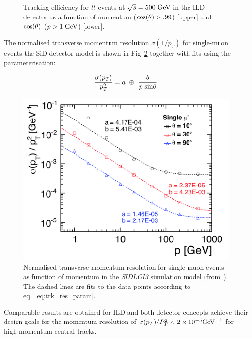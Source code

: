 \begin{figure}
\begin{tabular}[c]{c}
\end{tabular}
  \caption{Tracking efficiency for $t\bar t$-events at $\sqrt{s}=500~\rm{GeV}$ in the ILD detector as a function of
    momentum ($\rm{cos}(\theta)>.99$) [upper]
    and $\rm{cos}(\theta)$ ($p>1~\rm{GeV}$) [lower].}

\label{fig:ild_trkeff}
\end{figure}

The normalised transverse momentum resolution $\sigma(1/p_T)$ for single-muon events the SiD detector model is shown in
Fig~\ref{fig:sid_mom_res} together with fits using the parameterisation:

\begin{equation}
  \frac{\sigma(p_T)}{p^2_T} = a~\oplus~\frac{b}{p~\rm{sin}\theta}     \label{eq:trk_res_param}
\end{equation}

\begin{figure}
\begin{center}
\includegraphics[width=0.95\hsize]{chapters/figures/SiD_momentum_resolution.png}
\end{center}
\caption{Normalised transverse momentum resolution for single-muon events as function of momentum
  in the \emph{SIDLOI3} simulation model (from~\cite{Behnke:2013lya}). The dashed lines are fits to the data points according
  to eq.~\ref{eq:trk_res_param}.}
\label{fig:sid_mom_res}
\end{figure}

Comparable results are obtained for ILD and both detector concepts achieve their design goals for the momentum resolution of
$\sigma(p_T)/P^2_T  < 2 \times 10^{-5} \rm{GeV}^{-1}$ for high momentum central tracks.

